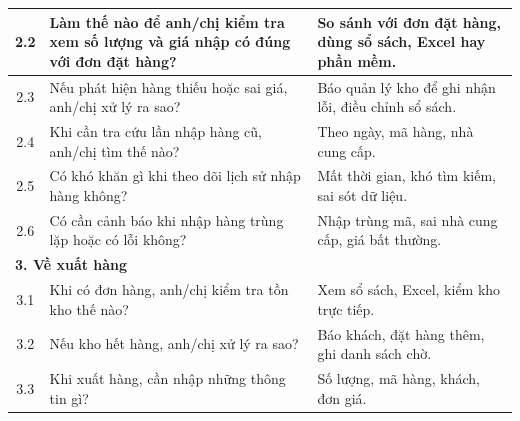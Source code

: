 \documentclass[a4paper,12pt]{report}
\begin{document}
\begin{longtable}{|c|p{8cm}|p{7cm}|}
    \hline
    2.2          & Làm thế nào để anh/chị kiểm tra xem số lượng và giá nhập có đúng với đơn đặt hàng?                                      & So sánh với đơn đặt hàng, dùng sổ sách, Excel hay phần mềm.                                                              \\
    \hline
    2.3          & Nếu phát hiện hàng thiếu hoặc sai giá, anh/chị xử lý ra sao?                                                            & Báo quản lý kho để ghi nhận lỗi, điều chỉnh sổ sách.                                                                     \\
    \hline
    2.4          & Khi cần tra cứu lần nhập hàng cũ, anh/chị tìm thế nào?                                                                  & Theo ngày, mã hàng, nhà cung cấp.                                                                                        \\
    \hline
    2.5          & Có khó khăn gì khi theo dõi lịch sử nhập hàng không?                                                                    & Mất thời gian, khó tìm kiếm, sai sót dữ liệu.                                                                            \\
    \hline
    2.6          & Có cần cảnh báo khi nhập hàng trùng lặp hoặc có lỗi không?                                                              & Nhập trùng mã, sai nhà cung cấp, giá bất thường.                                                                         \\
    \hline
    \multicolumn{3}{|l|}{\textbf{3. Về xuất hàng}}                                                                                                                                                                                                                    \\
    \hline
    3.1          & Khi có đơn hàng, anh/chị kiểm tra tồn kho thế nào?                                                                      & Xem sổ sách, Excel, kiểm kho trực tiếp.                                                                                  \\
    \hline
    3.2          & Nếu kho hết hàng, anh/chị xử lý ra sao?                                                                                 & Báo khách, đặt hàng thêm, ghi danh sách chờ.                                                                             \\
    \hline
    3.3          & Khi xuất hàng, cần nhập những thông tin gì?                                                                             & Số lượng, mã hàng, khách, đơn giá.                                                                                       \\

\end{longtable}
\end{document}
